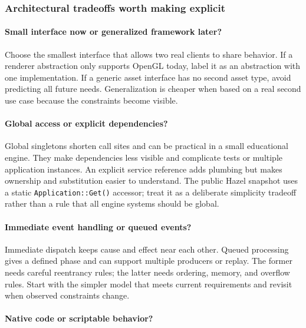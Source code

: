 \subsubsection{Architectural tradeoffs worth making explicit}\label{architectural-tradeoffs-worth-making-explicit}

\paragraph{Small interface now or generalized framework later?}\label{small-interface-now-or-generalized-framework-later}

Choose the smallest interface that allows two real clients to share behavior. If a renderer abstraction only supports OpenGL today, label it as an abstraction with one implementation. If a generic asset interface has no second asset type, avoid predicting all future needs. Generalization is cheaper when based on a real second use case because the constraints become visible.

\paragraph{Global access or explicit dependencies?}\label{global-access-or-explicit-dependencies}

Global singletons shorten call sites and can be practical in a small educational engine. They make dependencies less visible and complicate tests or multiple application instances. An explicit service reference adds plumbing but makes ownership and substitution easier to understand. The public Hazel snapshot uses a static \texttt{Application::Get()} accessor; treat it as a deliberate simplicity tradeoff rather than a rule that all engine systems should be global.

\paragraph{Immediate event handling or queued events?}\label{immediate-event-handling-or-queued-events}

Immediate dispatch keeps cause and effect near each other. Queued processing gives a defined phase and can support multiple producers or replay. The former needs careful reentrancy rules; the latter needs ordering, memory, and overflow rules. Start with the simpler model that meets current requirements and revisit when observed constraints change.

\paragraph{Native code or scriptable behavior?}\label{native-code-or-scriptable-behavior}

